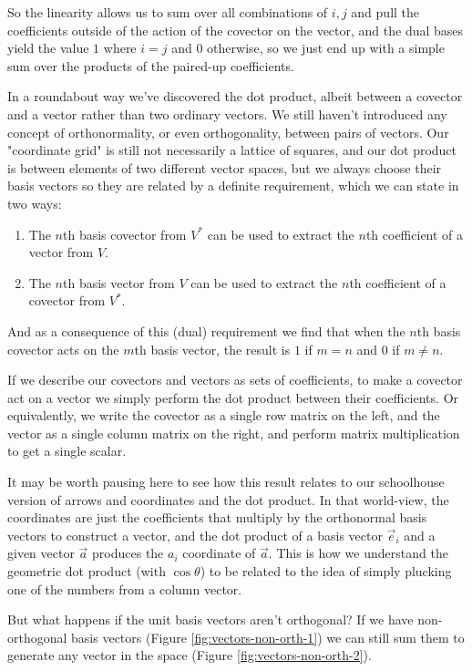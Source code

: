 So the linearity allows us to sum over all combinations of $i, j$ and pull the coefficients outside of the action of the covector on the vector, and the dual bases yield the value $1$ where $i = j$ and $0$ otherwise, so we just end up with a simple sum over the products of the paired-up coefficients.

In a roundabout way we've discovered the dot product, albeit between a covector and a vector rather than two ordinary vectors. We still haven't introduced any concept of orthonormality, or even orthogonality, between pairs of vectors. Our "coordinate grid" is still not necessarily a lattice of squares, and our dot product is between elements of two different vector spaces, but we always choose their basis vectors so they are related by a definite requirement, which we can state in two ways:

\begin{enumerate}
    \item The $n$th basis covector from $V^*$ can be used to extract the $n$th coefficient of a vector from $V$.
    \item The $n$th basis vector from $V$ can be used to extract the $n$th coefficient of a covector from $V^*$.
\end{enumerate}

And as a consequence of this (dual) requirement we find that when the $n$th basis covector acts on the $m$th basis vector, the result is $1$ if $m = n$ and $0$ if $m \ne n$.

If we describe our covectors and vectors as sets of coefficients, to make a covector act on a vector we simply perform the dot product between their coefficients. Or equivalently, we write the covector as a single row matrix on the left, and the vector as a single column matrix on the right, and perform matrix multiplication to get a single scalar.

It may be worth pausing here to see how this result relates to our schoolhouse version of arrows and coordinates and the dot product. In that world-view, the coordinates are just the coefficients that multiply by the orthonormal basis vectors to construct a vector, and the dot product of a basis vector $\vec{e}_i$ and a given vector $\vec{a}$ produces the $a_i$ coordinate of $\vec{a}$. This is how we understand the geometric dot product (with $\cos \theta$) to be related to the idea of simply plucking one of the numbers from a column vector.

But what happens if the unit basis vectors aren't orthogonal? If we have non-orthogonal basis vectors (Figure \ref{fig:vectors-non-orth-1}) we can still sum them to generate any vector in the space (Figure \ref{fig:vectors-non-orth-2}).


